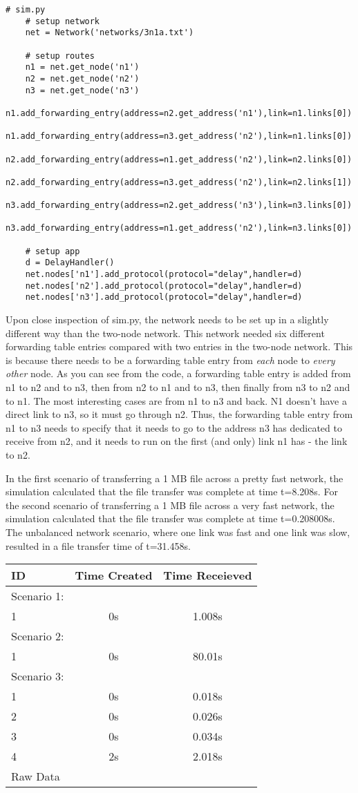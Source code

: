 \documentclass[11pt]{article}
\begin{document}
\begin{lstlisting}
# sim.py
    # setup network
    net = Network('networks/3n1a.txt')

    # setup routes
    n1 = net.get_node('n1')
    n2 = net.get_node('n2')
    n3 = net.get_node('n3')
    n1.add_forwarding_entry(address=n2.get_address('n1'),link=n1.links[0])
    n1.add_forwarding_entry(address=n3.get_address('n2'),link=n1.links[0])
    n2.add_forwarding_entry(address=n1.get_address('n2'),link=n2.links[0])
    n2.add_forwarding_entry(address=n3.get_address('n2'),link=n2.links[1])
    n3.add_forwarding_entry(address=n2.get_address('n3'),link=n3.links[0])
    n3.add_forwarding_entry(address=n1.get_address('n2'),link=n3.links[0])

    # setup app
    d = DelayHandler()
    net.nodes['n1'].add_protocol(protocol="delay",handler=d)
    net.nodes['n2'].add_protocol(protocol="delay",handler=d)
    net.nodes['n3'].add_protocol(protocol="delay",handler=d)
\end{lstlisting}

Upon close inspection of sim.py, the network needs to be set up in a slightly different way than the two-node network. This network needed six different forwarding table entries compared with two entries in the two-node network. This is because there needs to be a forwarding table entry from \emph{each} node to \emph{every other} node. As you can see from the code, a forwarding table entry is added from n1 to n2 and to n3, then from n2 to n1 and to n3, then finally from n3 to n2 and to n1. The most interesting cases are from n1 to n3 and back. N1 doesn't have a direct link to n3, so it must go through n2. Thus, the forwarding table entry from n1 to n3 needs to specify that it needs to go to the address n3 has dedicated to receive from n2, and it needs to run on the first (and only) link n1 has - the link to n2.

In the first scenario of transferring a 1 MB file across a pretty fast network, the simulation calculated that the file transfer was complete at time t=8.208s. For the second scenario of transferring a 1 MB file across a very fast network, the simulation calculated that the file transfer was complete at time t=0.208008s. The unbalanced network scenario, where one link was fast and one link was slow, resulted in a file transfer time of t=31.458s.

\vspace{0.5cm}
\begin{tabular}{lcc}
  \toprule
  ID & Time Created & Time Receieved\\
  \midrule
  Scenario 1: & & \\
  1 & 0s & 1.008s \\
  Scenario 2: & & \\
  1 & 0s & 80.01s \\
  Scenario 3: & & \\
  1 & 0s & 0.018s \\
  2 & 0s & 0.026s \\
  3 & 0s & 0.034s \\
  4 & 2s & 2.018s \\
  \bottomrule
  Raw Data
\end{tabular}
\vspace{0.5cm}
\end{document}
